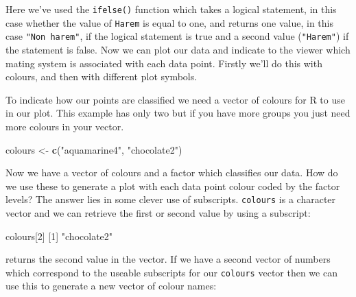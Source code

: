 \documentclass[
]{book}
\newenvironment{Shaded}{\begin{snugshade}}{\end{snugshade}}
\newcommand{\DecValTok}[1]{\textcolor[rgb]{0.00,0.00,0.81}{#1}}
\newcommand{\KeywordTok}[1]{\textcolor[rgb]{0.13,0.29,0.53}{\textbf{#1}}}
\newcommand{\NormalTok}[1]{#1}
\newcommand{\OperatorTok}[1]{\textcolor[rgb]{0.81,0.36,0.00}{\textbf{#1}}}
\newcommand{\StringTok}[1]{\textcolor[rgb]{0.31,0.60,0.02}{#1}}
\begin{document}
\begin{Shaded}
\end{Shaded}

Here we've used the \texttt{ifelse()} function which takes a logical statement, in this case whether the value of \texttt{Harem} is equal to one, and returns one value, in this case \texttt{"Non\ harem"}, if the logical statement is true and a second value (\texttt{"Harem"}) if the statement is false. Now we can plot our data and indicate to the viewer which mating system is associated with each data point. Firstly we'll do this with colours, and then with different plot symbols.

To indicate how our points are classified we need a vector of colours for R to use in our plot. This example has only two but if you have more groups you just need more colours in your vector.

\begin{Shaded}
\begin{Highlighting}[]
\NormalTok{colours <-}\StringTok{ }\KeywordTok{c}\NormalTok{(}\StringTok{"aquamarine4"}\NormalTok{, }\StringTok{"chocolate2"}\NormalTok{)}
\end{Highlighting}
\end{Shaded}

Now we have a vector of colours and a factor which classifies our data. How do we use these to generate a plot with each data point colour coded by the factor levels? The answer lies in some clever use of subscripts. \texttt{colours} is a character vector and we can retrieve the first or second value by using a subscript:

\begin{Shaded}
\begin{Highlighting}[]
\NormalTok{colours[}\DecValTok{2}\NormalTok{]}
\NormalTok{[}\DecValTok{1}\NormalTok{] }\StringTok{"chocolate2"}
\end{Highlighting}
\end{Shaded}

returns the second value in the vector. If we have a second vector of numbers which correspond to the useable subscripts for our \texttt{colours} vector then we can use this to generate a new vector of colour names:
\end{document}
